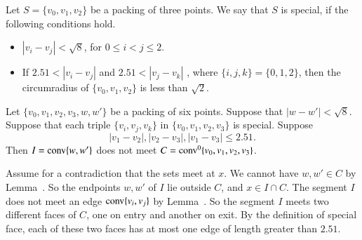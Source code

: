 \begin{tarskidata}
\begin{tarski}
\begin{definition}[special] 
Let $S=\{v_0,v_1,v_2\}$ be a packing of three
points.  We say that $S$ is special, if
the following conditions hold.  
\begin{itemize}
  \item $|v_i-v_j|<\sqrt8$, for
$0\le i< j \le 2$.  
   \item If $2.51 < |v_i-v_j|$ and $2.51 < |v_j-v_k|$ ,
   where $\{i,j,k\} = \{0,1,2\}$, then
  the circumradius of $\{v_0,v_1,v_2\}$ is less than $\sqrt2$.
  \end{itemize}
\end{definition}
\end{tarski}



\begin{tarski}

\begin{lemma}
Let $\{v_0,v_1,v_2,v_3,w,w'\}$ be a packing of six points. Suppose that
$|w-w'| < \sqrt8$.  Suppose that each triple $\{v_i,v_j,v_k\}$
in $\{v_0,v_1,v_2,v_3\}$ is special. 
Suppose   %
   $$
   |v_1-v_2|,|v_2-v_3|,|v_1-v_3|\le 2.51.
   $$
Then $I={\operatorname{conv}}\{w,w'\}$ does not meet $C={\operatorname{conv}}^0\{v_0,v_1,v_2,v_3\}$.
\end{lemma}


\begin{proved}  Assume for a contradiction that the sets meet at $x$.
We cannot have $w,w'\in C$ by
Lemma~.  So the endpoints $w,w'$ of $I$
lie outside $C$, and  $x\in I\cap C$.
The segment $I$ does not meet an edge ${\operatorname{conv}}\{v_i,v_j\}$
by Lemma~.  So the segment $I$ meets
two different faces of $C$, one on entry and another on exit.
By the definition of special face, each of these two faces has at most
one edge of length greater than $2.51$.  


\end{proved}
\end{tarski}
\end{tarskidata}
